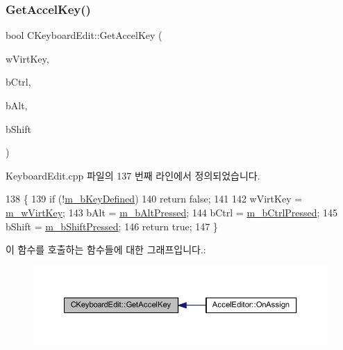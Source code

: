 \subsubsection{\texorpdfstring{Get\+Accel\+Key()}{GetAccelKey()}}
{\footnotesize\ttfamily bool C\+Keyboard\+Edit\+::\+Get\+Accel\+Key (\begin{DoxyParamCaption}\item[{W\+O\+RD \&}]{w\+Virt\+Key,  }\item[{bool \&}]{b\+Ctrl,  }\item[{bool \&}]{b\+Alt,  }\item[{bool \&}]{b\+Shift }\end{DoxyParamCaption})}



Keyboard\+Edit.\+cpp 파일의 137 번째 라인에서 정의되었습니다.


\begin{DoxyCode}
138 \{
139   \textcolor{keywordflow}{if} (!\mbox{\hyperlink{class_c_keyboard_edit_a9bf24703c8d1a3a019b43dc67c26c3a0}{m\_bKeyDefined}})
140     \textcolor{keywordflow}{return} \textcolor{keyword}{false};
141   
142   wVirtKey = \mbox{\hyperlink{class_c_keyboard_edit_a6a4efef92e151002720d0d930db29521}{m\_wVirtKey}};
143   bAlt = \mbox{\hyperlink{class_c_keyboard_edit_a724b035848eeca7bebc24e1309afeb6d}{m\_bAltPressed}};
144   bCtrl = \mbox{\hyperlink{class_c_keyboard_edit_a0dbb417bbaaeaa95c00fceaecd210064}{m\_bCtrlPressed}};
145   bShift = \mbox{\hyperlink{class_c_keyboard_edit_ac4a4f45be9ef923961ab92a48a28f789}{m\_bShiftPressed}};
146   \textcolor{keywordflow}{return} \textcolor{keyword}{true};
147 \}
\end{DoxyCode}
이 함수를 호출하는 함수들에 대한 그래프입니다.\+:
\nopagebreak
\begin{figure}[H]
\begin{center}
\leavevmode
\includegraphics[width=350pt]{class_c_keyboard_edit_a920dfccebef5e2260e59003e4959ef9f_icgraph}
\end{center}
\end{figure}
\mbox{\label{class_c_keyboard_edit_a7700247028b07400adf5056c6627e19a}} 
